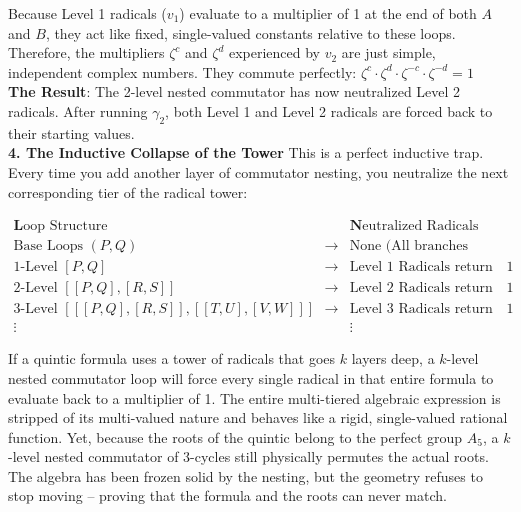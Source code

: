 Because Level 1 radicals (\(v_{1}\)) evaluate to a multiplier of 1 at the end of both \(A\) and \(B\), they act like fixed, single-valued constants relative to these loops. 
Therefore, the multipliers \(\zeta ^{c}\) and \(\zeta ^{d}\) experienced by \(v_{2}\) are just simple, independent complex numbers.  They commute perfectly:  \(\zeta ^{c}\cdot \zeta ^{d}\cdot \zeta ^{-c}\cdot \zeta ^{-d}=1\)\\

{\bf The Result}: The 2-level nested commutator has now neutralized Level 2 radicals. After running \(\gamma _{2}\), both Level 1 and Level 2 radicals are forced back to their starting values.\\

{\bf 4. The Inductive Collapse of the Tower}
This is a perfect inductive trap. Every time you add another layer of commutator nesting, you neutralize the next corresponding tier of the radical tower:

\[\begin{array}{rcc}
\mathbf{L}\text{oop\ Structure}&& \mathbf{N}\text{eutralized\ Radicals}\\ 
\hline \text{Base\ Loops\ } (P,Q) & \longrightarrow &\text{None\ (All\ branches\ twist)}\\ 
\text{1-Level\ } [P,Q] & \longrightarrow &\text{Level\ 1\ Radicals\ return\ to\ }1\\ 
\text{2-Level\ } [[P,Q],[R,S]] & \longrightarrow &\text{Level\ 2\ Radicals\ return\ to\ }1\\
 \text{3-Level\ } [[[P,Q],[R,S]],[[T,U],[V,W]]] & \longrightarrow &\text{Level\ 3\ Radicals\ return\ to\ }1\\ 
 \vdots &&\vdots 
 \end{array}\]
 
 If a quintic formula uses a tower of radicals that goes \(k\) layers deep, a \(k\)-level nested commutator loop will force every single radical in that entire formula to evaluate back to a multiplier of 1. The entire multi-tiered algebraic expression is stripped of its multi-valued nature and behaves like a rigid, single-valued rational function. Yet, because the roots of the quintic belong to the perfect group \(A_{5}\), a \(k\)-level nested commutator of 3-cycles still physically permutes the actual roots. The algebra has been frozen solid by the nesting, but the geometry refuses to stop moving -- proving that the formula and the roots can never match.
 

